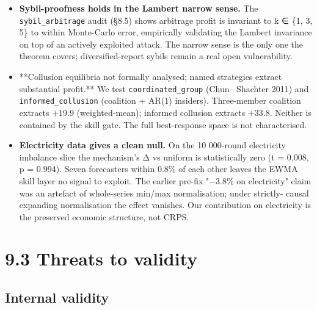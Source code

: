 \documentclass[11pt,a4paper,openany]{report}
\begin{document}
\begin{itemize}
    broadcasting the wager-weighted mean of its members' beliefs earns
    +16.9 to +19.9 over 1000 rounds (§8.6). Combining coalition with
    privileged lagged information (§8.7) compounds the two channels
    and extracts ≈ 40\% more than pure collusion (+33.84 vs +24.12).
  \item \textbf{Sybil-proofness holds in the Lambert narrow sense.} The
    \texttt{sybil\_arbitrage} audit (§8.5) shows arbitrage profit is invariant
    to k ∈ \{1, 3, 5\} to within Monte-Carlo error, empirically
    validating the Lambert invariance on top of an actively exploited
    attack. The narrow sense is the only one the theorem covers;
    diversified-report sybils remain a real open vulnerability.
  \item **Collusion equilibria not formally analysed; named strategies
    extract substantial profit.** We test \texttt{coordinated\_group} (Chun–
    Shachter 2011) and \texttt{informed\_collusion} (coalition + AR(1)
    insiders). Three-member coalition extracts +19.9 (weighted-mean);
    informed collusion extracts +33.8. Neither is contained by the
    skill gate. The full best-response space is not characterised.
  \item \textbf{Electricity data gives a clean null.} On the 10 000-round
    electricity imbalance slice the mechanism's Δ vs uniform is
    statistically zero (t = 0.008, p = 0.994). Seven forecasters within
    0.8\% of each other leaves the EWMA skill layer no signal to
    exploit. The earlier pre-fix "−3.8\% on electricity" claim was an
    artefact of whole-series min/max normalisation; under strictly-
    causal expanding normalisation the effect vanishes. Our
    contribution on electricity is the preserved economic structure,
    not CRPS.
\end{itemize}

\section{9.3 Threats to validity}

\subsection{Internal validity}
\end{document}

